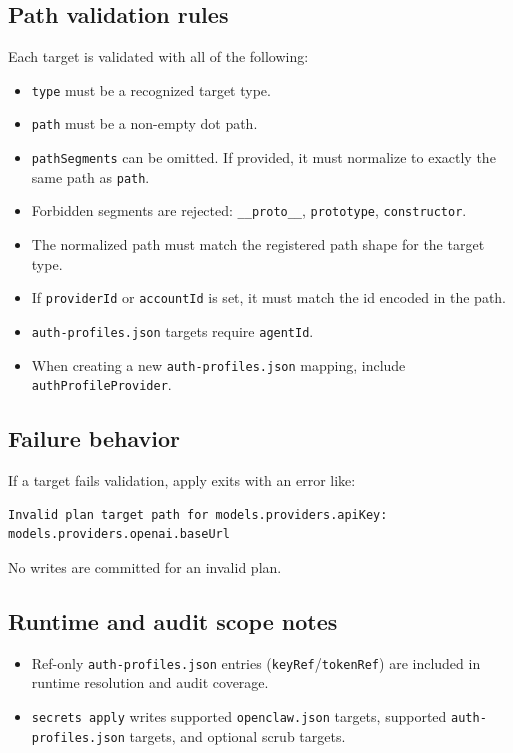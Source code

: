 \subsection{Path validation rules}


Each target is validated with all of the following:

\begin{itemize}
  \item \texttt{type} must be a recognized target type.
  \item \texttt{path} must be a non-empty dot path.
  \item \texttt{pathSegments} can be omitted. If provided, it must normalize to exactly the same path as \texttt{path}.
  \item Forbidden segments are rejected: \texttt{\_\_proto\_\_}, \texttt{prototype}, \texttt{constructor}.
  \item The normalized path must match the registered path shape for the target type.
  \item If \texttt{providerId} or \texttt{accountId} is set, it must match the id encoded in the path.
  \item \texttt{auth-profiles.json} targets require \texttt{agentId}.
  \item When creating a new \texttt{auth-profiles.json} mapping, include \texttt{authProfileProvider}.
\end{itemize}


\subsection{Failure behavior}


If a target fails validation, apply exits with an error like:

\begin{lstlisting}
Invalid plan target path for models.providers.apiKey: models.providers.openai.baseUrl
\end{lstlisting}


No writes are committed for an invalid plan.

\subsection{Runtime and audit scope notes}


\begin{itemize}
  \item Ref-only \texttt{auth-profiles.json} entries (\texttt{keyRef}/\texttt{tokenRef}) are included in runtime resolution and audit coverage.
  \item \texttt{secrets apply} writes supported \texttt{openclaw.json} targets, supported \texttt{auth-profiles.json} targets, and optional scrub targets.
\end{itemize}


